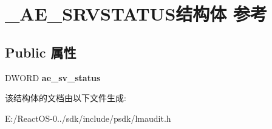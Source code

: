 \hypertarget{struct___a_e___s_r_v_s_t_a_t_u_s}{}\section{\+\_\+\+A\+E\+\_\+\+S\+R\+V\+S\+T\+A\+T\+U\+S结构体 参考}
\label{struct___a_e___s_r_v_s_t_a_t_u_s}
\subsection*{Public 属性}
\begin{DoxyCompactItemize}
\item 
\mbox{\label{struct___a_e___s_r_v_s_t_a_t_u_s_a4f3601198903700f7869a8767d7a43cd}} 
D\+W\+O\+RD {\bfseries ae\+\_\+sv\+\_\+status}
\end{DoxyCompactItemize}


该结构体的文档由以下文件生成\+:\begin{DoxyCompactItemize}
\item 
E\+:/\+React\+O\+S-\/0../sdk/include/psdk/lmaudit.\+h\end{DoxyCompactItemize}
